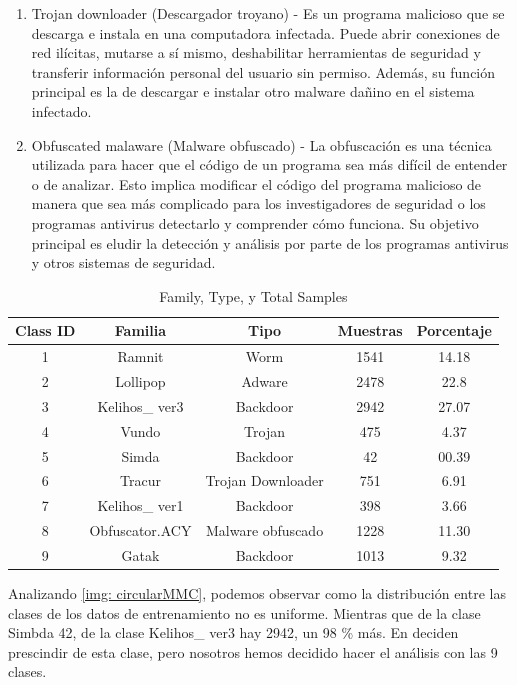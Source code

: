 \begin{enumerate}
\item Trojan downloader (Descargador troyano) - Es un programa malicioso que se descarga e instala en una computadora infectada. Puede abrir conexiones de red ilícitas, mutarse a sí mismo, deshabilitar herramientas de seguridad y transferir información personal del usuario sin permiso. Además, su función principal es la de descargar e instalar otro malware dañino en el sistema infectado.

\item Obfuscated malaware (Malware obfuscado) - La obfuscación es una técnica utilizada para hacer que el código de un programa sea más difícil de entender o de analizar. Esto implica modificar el código del programa malicioso de manera que sea más complicado para los investigadores de seguridad o los programas antivirus detectarlo y comprender cómo funciona. Su objetivo principal es eludir la detección y análisis por parte de los programas antivirus y otros sistemas de seguridad.

\end{enumerate} 

\begin{table}[htbp]
\centering
\caption{Family, Type, y Total Samples}
\begin{tabular}{ccccc}
\hline
Class ID & Familia & Tipo & Muestras & Porcentaje \\
\hline
1 & Ramnit & Worm & 1541 & 14.18 \\
2 & Lollipop & Adware & 2478 & 22.8 \\
3 & Kelihos\_ ver3 & Backdoor & 2942 & 27.07\\
4 & Vundo & Trojan & 475 & 4.37\\
5 & Simda & Backdoor & 42 & 00.39\\
6 & Tracur & Trojan Downloader & 751 & 6.91 \\
7 & Kelihos\_ ver1 & Backdoor & 398 & 3.66\\
8 & Obfuscator.ACY & Malware obfuscado & 1228 & 11.30 \\
9 & Gatak & Backdoor & 1013 & 9.32\\
\hline
\end{tabular} \label{tab: classMMC}
\end{table}


Analizando \ref{img: circularMMC}, podemos observar como la distribución entre las clases de los datos de entrenamiento no es uniforme. Mientras que de la clase Simbda 42, de la clase Kelihos\_ ver3 hay 2942, un 98 \% más. En \citep{kebede2017classification} deciden prescindir de esta clase, pero nosotros hemos decidido hacer el análisis con las 9 clases.  

